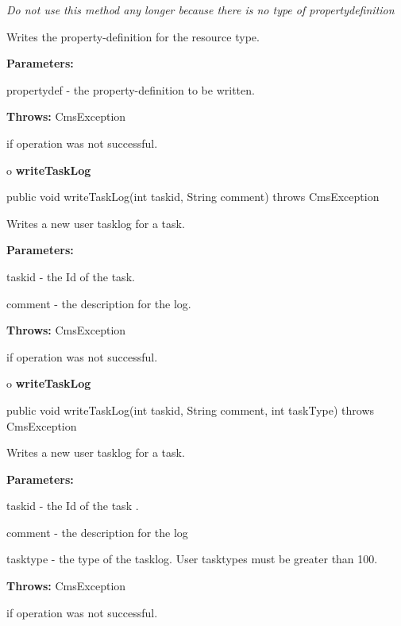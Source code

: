 \begin{description}
 {\it Do not use
this method any longer because there is no type of propertydefinition} 

Writes the property-definition for the resource type. 

\begin{description}
\item {\bf Parameters:}  

propertydef - the property-definition to be written.  
\item {\bf Throws:} CmsException  

if operation was not successful.  
\end{description}

\end{description}

o {\bf writeTaskLog} 

\begin{PRE}
 public void writeTaskLog(int taskid,
                          String comment) throws CmsException
\end{PRE}

\begin{description}
\htmlDD Writes a new user tasklog for a task. 

\begin{description}
\item {\bf Parameters:}  

taskid - the Id of the task.  

comment - the description for the log.  
\item {\bf Throws:} CmsException  

if operation was not successful.  
\end{description}

\end{description}

o {\bf writeTaskLog} 

\begin{PRE}
 public void writeTaskLog(int taskid,
                          String comment,
                          int taskType) throws CmsException
\end{PRE}

\begin{description}
\htmlDD Writes a new user tasklog for a task. 

\begin{description}
\item {\bf Parameters:}  

taskid - the Id of the task .  

comment - the description for the log  

tasktype - the type of the tasklog. User tasktypes must be greater than 100.  
\item {\bf Throws:} CmsException  

if operation was not successful.  
\end{description}

\end{description}


